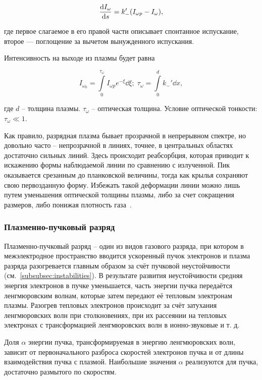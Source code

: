 \documentclass[10pt, a4paper]{article}
\begin{document}
\begin{equation*}
	\dv{I_\omega}{s} = k_{-}'(I_{\omega p}-I_\omega),
\end{equation*}

где первое слагаемое в его правой части описывает спонтанное испускание, второе — поглощение за вычетом вынужденного испускания.

Интенсивность на выходе из плазмы будет равна~\cite{raizer}

\begin{equation*}
	I_{\omega_0} = \int\limits_0^{\tau_\omega} I_{\omega p}e^{-\xi}\dd{\xi}; \; \tau_\omega = \int\limits_0^dk_{-}'\dd{x},
\end{equation*}

где $d$ -- толщина плазмы. $\tau_\omega$ -- оптическая толщина. Условие оптической тонкости: $\tau_\omega\ll1$.

Как правило, разрядная плазма бывает прозрачной в непрерывном спектре, но довольно часто -- непрозрачной в линиях, точнее, в центральных областях достаточно сильных линий. Здесь происходит реабсорбция, которая приводит к искажению формы наблюдаемой линии по сравнению с излученной. Пик оказывается срезанным до планковской величины, тогда как крылья сохраняют свою первозданную форму. Избежать такой деформации линии можно лишь путем уменьшения оптической толщины плазмы, либо за счет сокращения размеров, либо понижая плотность газа~\cite{raizer}.	

\subsubsection{Плазменно-пучковый разряд}

Плазменно-пучковый разряд -- один из видов газового разряда, при котором в межэлектродное пространство вводится ускоренный пучок электронов и плазма разряда разогревается главным образом за счёт пучковой неустойчивости (см.~\ref{subsubsec:instabilities}). В результате развития неустойчивости средняя энергия электронов в пучке уменьшается, часть энергии пучка передаётся ленгмюровским волнам, которые затем передают её тепловым электронам плазмы. Разогрев тепловых электронов происходит за счёт затухания ленгмюровских волн при столкновениях, при их рассеянии на тепловых электронах с трансформацией ленгмюровских волн в ионно-звуковые и т. д. 

Доля $\alpha$ энергии пучка, трансформируемая в энергию ленгмюровских волн, зависит от первоначального разброса скоростей электронов пучка и от длины взаимодействия пучка с плазмой. Наибольшие значения $\alpha$ реализуются для пучка, достаточно размытого по скоростям.
\end{document}
